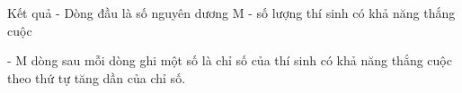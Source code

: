 Kết quả
- Dòng đầu là số nguyên dương M - số lượng thí sinh có khả năng thắng cuộc   


   - M dòng sau mỗi dòng ghi một số là chỉ số của thí sinh có khả năng thắng cuộc theo thứ tự tăng dần của chỉ số.